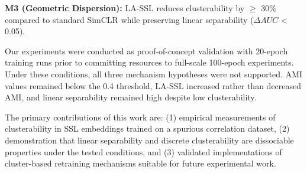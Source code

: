\textbf{M3 (Geometric Dispersion):} LA-SSL reduces clusterability by $\geq$ 30\% compared to standard SimCLR while preserving linear separability ($\Delta AUC$ < 0.05).

Our experiments were conducted as proof-of-concept validation with 20-epoch training runs prior to committing resources to full-scale 100-epoch experiments. Under these conditions, all three mechanism hypotheses were not supported. AMI values remained below the 0.4 threshold, LA-SSL increased rather than decreased AMI, and linear separability remained high despite low clusterability.

The primary contributions of this work are: (1) empirical measurements of clusterability in SSL embeddings trained on a spurious correlation dataset, (2) demonstration that linear separability and discrete clusterability are dissociable properties under the tested conditions, and (3) validated implementations of cluster-based retraining mechanisms suitable for future experimental work.
